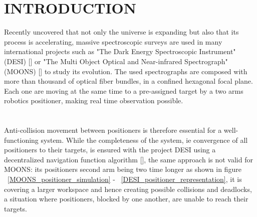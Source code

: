 \documentclass[]{spie}  %
\begin{document}
	
	\section{INTRODUCTION}
	\label{INTRODUCTION}
	Recently uncovered that not only the universe is expanding but also that its process is accelerating, massive spectroscopic surveys are used in many international projects such as  "The Dark Energy Spectroscopic Instrument" (DESI) [] or  "The Multi Object Optical and Near-infrared Spectrograph" (MOONS) []  to study its evolution. The used spectrographs are composed with more than thousand of optical fiber bundles, in a confined hexagonal focal plane. Each one are moving at the same time to a pre-assigned target by a two arms robotics positioner, making real time observation possible.\\\\\\
	Anti-collision movement between positioners is therefore essential for a well-functioning system. While the completeness of the system, ie convergence of all positioners to their targets, is ensured with the project DESI using a decentralized navigation function algorithm  [], the same approach is not valid for MOONS: its positioners second arm being two time longer as shown in figure ~\ref{MOONS_positioner_simulation} - ~\ref{DESI_positioner_representation}, it is covering a larger workspace and hence creating possible collisions and deadlocks, a situation where positioners, blocked by one another, are unable to reach their targets.\\
	
\end{document}
